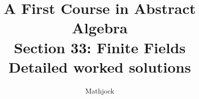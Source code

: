 
\title{\textbf{A First Course in Abstract Algebra}\\[0.3em]Section 33: Finite Fields\\[0.3em]\large Detailed worked solutions}
\author{Mathjock}
\date{}

\maketitle
\bookinfo
\tableofcontents
\clearpage
\renewcommand{\thesection}{33}
\renewcommand{\theHsection}{fraleigh.33}


